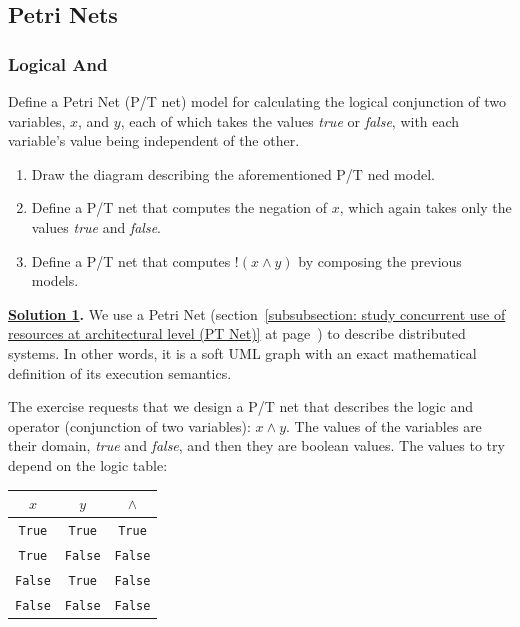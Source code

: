 \subsection{Petri Nets}

\subsubsection{Logical And}

\descriptionproblem
Define a Petri Net (P/T net) model for calculating the logical conjunction of two variables, $x$, and $y$, each of which takes the values \emph{true} or \emph{false}, with each variable's value being independent of the other.

\questionproblem
\begin{enumerate}
    \item Draw the diagram describing the aforementioned P/T ned model.

    \item Define a P/T net that computes the negation of $x$, which again takes only the values \emph{true} and \emph{false}.
    
    \item Define a P/T net that computes $!\left(x \land y\right)$ by composing the previous models.
\end{enumerate}

\solution
\textbf{\underline{Solution 1}.} We use a Petri Net (section~\ref{subsubsection: study concurrent use of resources at architectural level (PT Net)} at page~\pageref{subsubsection: study concurrent use of resources at architectural level (PT Net)}) to describe distributed systems. In other words, it is a soft UML graph with an exact mathematical definition of its execution semantics.


The exercise requests that we design a P/T net that describes the logic and operator (conjunction of two variables): $x \land y$. The values of the variables are their domain, \emph{true} and \emph{false}, and then they are boolean values. The values to try depend on the logic table:

\begin{table}[!htp]
    \centering
    \begin{tabular}{@{} c c c @{}}
        \toprule
        $x$ & $y$ & $\land$ \\
        \midrule
        \texttt{True} & \texttt{True} & \texttt{True} \\
        \texttt{True} & \texttt{False} & \texttt{False} \\
        \texttt{False} & \texttt{True} & \texttt{False} \\
        \texttt{False} & \texttt{False} & \texttt{False} \\
        \bottomrule
    \end{tabular}
\end{table}

